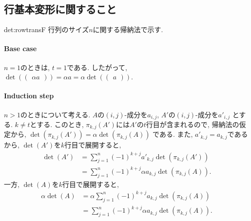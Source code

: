 \subsection{行基本変形に関すること}
\begin{proofof*}{det:rowtrans}{F}
  行列のサイズ$n$に関する帰納法で示す.
  \paragraph{Base case}
  $n=1$のときは,
  $t=1$である.
  したがって,
  $\det(\begin{pmatrix}\alpha a\end{pmatrix})=\alpha a=\alpha \det(\begin{pmatrix}a\end{pmatrix})$.
  \paragraph{Induction step}
  $n>1$のときについて考える.
  $A$の$(i,j)$-成分を$a_{i,j}$,
  $A'$の$(i,j)$-成分を$a'_{i,j}$
  とする.
  $k\neq t$とする.
  このとき,
  $\pi_{k,j}(A')$には$A'$の$t$行目が含まれるので,
  帰納法の仮定から,
  $\det(\pi_{k,j}(A'))=\alpha\det(\pi_{k,j}(A))$
  である.
  また, $a'_{k,j}=a_{k,j}$であるから,
  $\det(A')$を$k$行目で展開すると,
  \begin{align*}
    \det(A')
    &=\sum_{j=1}^{n} (-1)^{k+j} a'_{k,j}\det(\pi_{k,j}(A'))\\
    &=\sum_{j=1}^{n} (-1)^{k+j} \alpha a_{k,j}\det(\pi_{k,j}(A)).
  \end{align*}
  一方, $\det(A)$を$k$行目で展開すると,
  \begin{align*}
    \alpha \det(A)
    &=\alpha \sum_{j=1}^{n} (-1)^{k+j} a_{k,j}\det(\pi_{k,j}(A))\\
    &=\sum_{j=1}^{n} (-1)^{k+j} \alpha a_{k,j}\det(\pi_{k,j}(A)).
  \end{align*}  
    
\end{proofof*}

